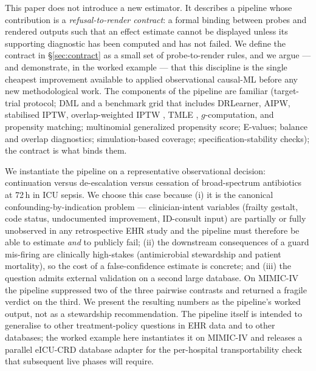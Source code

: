 \documentclass[11pt,a4paper]{article}
\begin{document}
This paper does not introduce a new estimator. It describes a pipeline whose contribution is a \emph{refusal-to-render contract}: a formal binding between probes and rendered outputs such that an effect estimate cannot be displayed unless its supporting diagnostic has been computed and has not failed. We define the contract in \S\ref{sec:contract} as a small set of probe-to-render rules, and we argue --- and demonstrate, in the worked example --- that this discipline is the single cheapest improvement available to applied observational causal-ML before any new methodological work. The components of the pipeline are familiar (target-trial protocol; DML and a benchmark grid that includes DRLearner, AIPW, stabilised IPTW, overlap-weighted IPTW \cite{li2018overlap}, TMLE \cite{vanderlaan2011tmle}, $g$-computation, and propensity matching; multinomial generalized propensity score; E-values; balance and overlap diagnostics; simulation-based coverage; specification-stability checks); the contract is what binds them.

We instantiate the pipeline on a representative observational decision: continuation versus de-escalation versus cessation of broad-spectrum antibiotics at 72\,h in ICU sepsis. We choose this case because (i) it is the canonical confounding-by-indication problem --- clinician-intent variables (frailty gestalt, code status, undocumented improvement, ID-consult input) are partially or fully unobserved in any retrospective EHR study and the pipeline must therefore be able to estimate \emph{and} to publicly fail; (ii) the downstream consequences of a guard mis-firing are clinically high-stakes (antimicrobial stewardship and patient mortality), so the cost of a false-confidence estimate is concrete; and (iii) the question admits external validation on a second large database. On MIMIC-IV the pipeline suppressed two of the three pairwise contrasts and returned a fragile verdict on the third. We present the resulting numbers as the pipeline's worked output, not as a stewardship recommendation. The pipeline itself is intended to generalise to other treatment-policy questions in EHR data and to other databases; the worked example here instantiates it on MIMIC-IV and releases a parallel eICU-CRD database adapter for the per-hospital transportability check that subsequent live phases will require.
\end{document}
